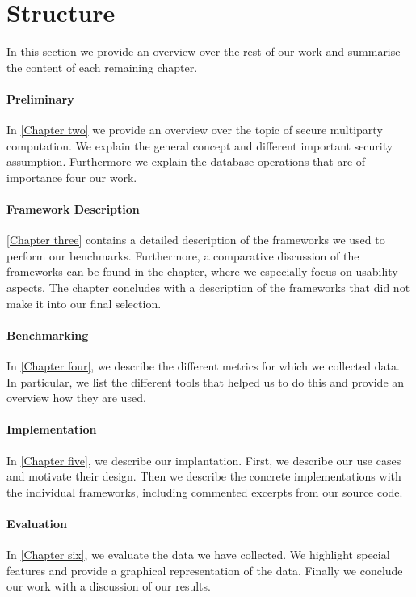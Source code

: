 \section{Structure}
In this section we provide an overview over the rest of our work and summarise the content of each remaining chapter.
\paragraph{Preliminary}

In \hyperref[Preliminary]{[Chapter two]} we provide an overview over the topic of secure multiparty computation. We explain the general concept and different important security assumption. Furthermore we explain the database operations that are of importance four our work. 
\paragraph{Framework Description}
\hyperref[Framework Desciption]{[Chapter three]} contains a detailed description of the frameworks we used to perform our benchmarks. Furthermore, a comparative discussion of the frameworks can be found in the chapter, where we especially focus on usability aspects. The chapter concludes with a description of the frameworks that did not make it into our final selection. 
\paragraph{Benchmarking}
In \hyperref[Benchmarking]{[Chapter four]}, we describe the different metrics for which we collected data. In particular, we list the different tools that helped us to do this and provide an overview how they are used. 
\paragraph{Implementation}
In \hyperref[Implementation]{[Chapter five]}, we describe our implantation. First, we describe our use cases and motivate their design.  Then we describe the concrete implementations with the individual frameworks, including commented excerpts from our source code.
\paragraph{Evaluation}
In \hyperref[Evaluation]{[Chapter six]}, we evaluate the data we have collected. We highlight special features and provide a graphical representation of the data. 
Finally we conclude our work with a discussion of our results.
